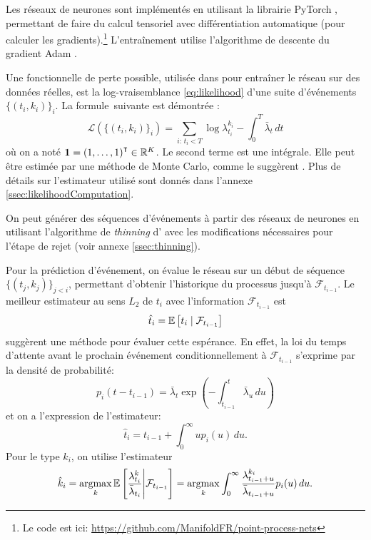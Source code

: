 \documentclass[../main.tex]{subfiles}
\begin{document}
	
Les réseaux de neurones sont implémentés en utilisant la librairie \textsf{PyTorch} \cite{paszke2017automatic}, permettant de faire du calcul tensoriel avec différentiation automatique (pour calculer les gradients).\footnote{Le code est ici: \url{https://github.com/ManifoldFR/point-process-nets}} L'entraînement utilise l'algorithme de descente du gradient Adam \autocite{AdamKingmaB14}.

Une fonctionnelle de perte possible, utilisée dans \autocite{meiEisnerNeuralHawkes} pour entraîner le réseau sur des données réelles, est la log-vraisemblance \eqref{eq:likelihood} d'une suite d'événements $\{(t_i,k_i)\}_i$. La formule\footnotemark~suivante est démontrée \cite[15]{meiEisnerNeuralHawkes}: 
\begin{equation}\label{eq:explicitLikelihood}
\mathcal{L}\left(\{(t_i,k_i)\}_i\right)
=
\sum_{i:\, t_i < T} \log\lambda^{k_i}_{t_i} - \int_0^T \bar\lambda_t\,dt
\end{equation}
où on a noté $\mathbf{1} = {(1,\ldots,1)}^\intercal\in\mathbb{R}^K$. Le second terme est une intégrale. Elle peut être estimée par une méthode de Monte Carlo, comme le suggèrent \citeauthor{meiEisnerNeuralHawkes}. Plus de détails sur l'estimateur utilisé sont donnés dans l'annexe \ref{ssec:likelihoodComputation}.


On peut générer des séquences d'événements à partir des réseaux de neurones en utilisant l'algorithme de \textit{thinning} d'\citeauthor{ogata1981} \autocite{ogata1981} avec les modifications nécessaires pour l'étape de rejet (voir annexe \ref{ssec:thinning}).

Pour la prédiction d'événement, on évalue le réseau sur un début de séquence $\{(t_j,k_j)\}_{j < i}$, permettant d'obtenir l'historique du processus jusqu'à $\mathcal{F}_{t_{i-1}}$. Le meilleur estimateur au sens $L_2$ de $t_i$ avec l'information $\mathcal{F}_{t_{i-1}}$ est
\[
	\hat{t}_i = \mathbb{E}\left[ t_i \mid \mathcal{F}_{t_{i-1}} \right]
\]
\citeauthor{meiEisnerNeuralHawkes} suggèrent une méthode pour évaluer cette espérance. En effet, la loi du temps d'attente avant le prochain événement conditionnellement à $\mathcal{F}_{t_{i-1}}$ s'exprime par la densité de probabilité:
\begin{equation}\label{eq:nextIncrementDensity}
	p_i(t-t_{i-1}) = \bar\lambda_t\exp\left(-\int_{t_{i-1}}^t\bar\lambda_u\,du\right)
\end{equation}
et on a l'expression de l'estimateur:
\begin{equation}\label{eq:nextEventTimeEstimator}
	\hat{t}_i = t_{i-1} + \int_0^\infty u p_i(u)\,du.
\end{equation}
Pour le type $k_i$, on utilise l'estimateur
\begin{equation}
\hat{k}_i = \operatorname*{argmax}_{k} \mathbb{E}\left[\frac{\lambda^{k}_{t_i}}{\bar\lambda_{t_i}}\middle| \mathcal{F}_{t_{i-1}} \right] = \operatorname*{argmax}_k \int_0^\infty \frac{\lambda^{k_i}_{t_{i-1}+u}}{\bar\lambda_{t_{i-1}+u}} p_i(u)\,du.
\end{equation}
\end{document}
